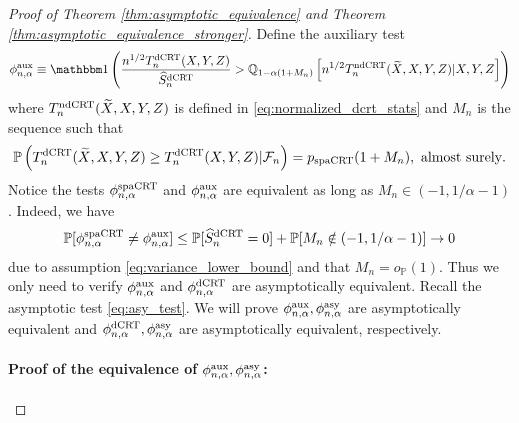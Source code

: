 \documentclass[12pt]{article}
\theoremstyle{definition}
\def\P{\mathbb{P}}
\def\P{\mathbb{P}}
\renewcommand{\P}{\mathbb{P}}							%
\newcommand{\Q}{\mathbb{Q}}								%
\newcommand{\indicator}{\mathbbm 1}						%
\newcommand{\srx}{X}									%
\newcommand{\srz}{Z}									%
\newcommand{\srxk}{\widetilde X}						%
\newcommand{\sry}{Y}									%
\newcommand{\dCRT}{\textnormal{dCRT}} 					%
\newcommand{\ndCRThat}{\textnormal{ndCRT}}	%
\newcommand{\spacrt}{\textnormal{spaCRT}}               %
\newcommand{\aux}{\textnormal{aux}}               %
\newcommand{\asy}{\textnormal{asy}}              %
\begin{document}
  \begin{proof}[Proof of Theorem \ref{thm:asymptotic_equivalence} and Theorem \ref{thm:asymptotic_equivalence_stronger}]
	Define the auxiliary test 
	  \begin{align*}
		  \phi^{\aux}_{n,\alpha}\equiv \indicator\left(\frac{n^{1/2}T_n^{\dCRT}(\srx,\sry,\srz)}{\widehat{S}_n^{\dCRT}}>\Q_{1-\alpha(1+M_n)}\left[n^{1/2}T_n^{\ndCRThat}(\widetilde{X},X,Y,Z)|X,Y,Z\right]\right)
	  \end{align*}
	where $T_n^{\ndCRThat}(\srxk,\srx,\sry,\srz)$ is defined in \eqref{eq:normalized_dcrt_stats} and $M_n$ is the sequence such that
	\begin{align*}
	  \P\left(T_n^{\dCRT}(\srxk,\srx,\sry,\srz)\geq T_n^{\dCRT}(\srx,\sry,\srz)|\mathcal{F}_n\right)=p_{\spacrt}(1+M_n),\text{ almost surely}.
	\end{align*}
	  Notice the tests $\phi_{n,\alpha}^{\spacrt}$ and $\phi_{n,\alpha}^{\aux}$ are equivalent as long as $M_n \in (-1, 1/\alpha - 1)$. Indeed, we have 
	\begin{align*}
	  \P[\phi_{n,\alpha}^{\spacrt}\neq \phi_{n,\alpha}^{\aux}]\leq \P[\widehat S_n^{\dCRT}=0]+\P[M_n \notin (-1, 1/\alpha - 1)]\rightarrow0
	\end{align*}
	due to assumption \eqref{eq:variance_lower_bound} and that $M_n=o_{\P}(1)$. Thus we only need to verify $\phi_{n,\alpha}^{\aux}$ and $\phi_{n,\alpha}^{\dCRT}$ are asymptotically equivalent. Recall the asymptotic test \eqref{eq:asy_test}. We will prove $\phi_{n,\alpha}^{\aux},\phi_{n,\alpha}^{\asy}$ are asymptotically equivalent and $\phi_{n,\alpha}^{\dCRT},\phi_{n,\alpha}^{\asy}$ are asymptotically equivalent, respectively.
  
	\paragraph{Proof of the equivalence of $\phi_{n,\alpha}^{\aux},\phi_{n,\alpha}^{\asy}$:}
	

\end{proof}
\end{document}
